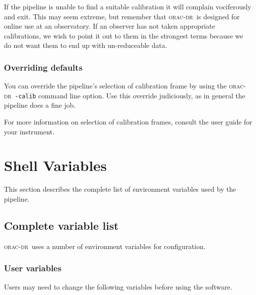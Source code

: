 \documentclass[twoside,11pt]{article}
\renewcommand{\_}{\texttt{\symbol{95}}}
\newcommand{\oracdr}{\textsc{orac-dr}}
\begin{document}
If the pipeline is unable to find a suitable calibration it will
complain vociferously and exit. This may seem extreme, but remember
that \oracdr\ is designed for online use at an observatory. If an
observer has not taken appropriate calibrations, we wish to point
it out to them in the strongest terms because we do not want them
to end up with un-reduceable data.

\subsubsection*{Overriding defaults\label{The_ORAC-DR_Calibration_Selection_Overriding_defaults}}

You can override the pipeline's selection of calibration frame by
using the \oracdr\ \texttt{-calib} command line option. Use this override
judiciously, as in general the pipeline does a fine job.



For more information on selection of calibration frames, consult the
user guide for your instrument.


\section{Shell Variables\label{Shell_Variables}}


This section describes the complete list of environment variables
used by the pipeline.

\subsection*{Complete variable list\label{Shell_Variables_Complete_variable_list}}

\oracdr\ uses a number of environment variables for configuration.

\subsubsection*{User variables\label{Shell_Variables_User_variables}}

Users may need to change the following variables before using the
software.
\end{document}
